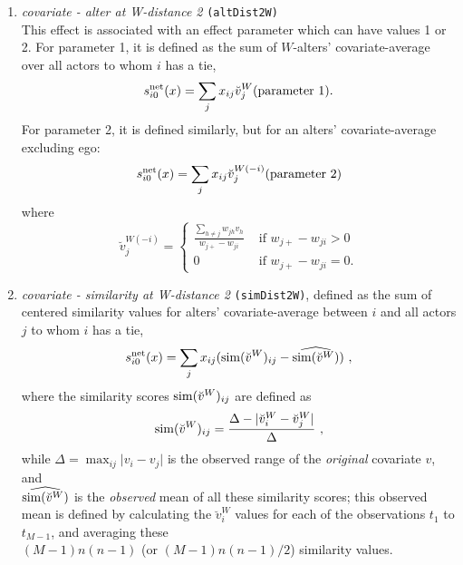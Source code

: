 \documentclass[a4paper,fleqn,11pt]{article}
\newcommand{\+}{\, + \,}
\newcommand{\vit}{\theenumi}
\newcounter{savenumi}
\begin{document}
\begin{enumerate}
\setcounter{enumi}{\value{savenumi}}

\item \emph{covariate - alter at W-distance 2} \texttt{(altDist2W)} \\ %
      This effect is associated with an effect parameter
      which can have values 1 or 2.
      For parameter 1, it is
      defined as the sum of $W$-alters' covariate-average over all actors
      to whom $i$ has a tie,
\[
 s^{\rm net}_{i\vit}(x) = \sum_j x_{ij} \breve v_j^W \hfill (\text{parameter 1}). \hfill
\]
      For parameter 2, it is defined similarly,
      but for an alters' covariate-average excluding
      ego:
\[
 s^{\rm net}_{i\vit}(x) = \sum_j x_{ij} \breve v_j^{W(-i)} \hfill (\text{parameter 2}) \hfill
\]
      where
\begin{equation}
  \breve v_j^{W(-i)} = \left\{\begin{array}{ll} \displaystyle
         \frac{\sum_{h \neq j} w_{jh}v_h}{w_{j+} - w_{ji}}  &  \text{ if } w_{j+} - w_{ji} > 0     \\
         0                                &  \text{ if } w_{j+}- w_{ji} = 0  .
  \end{array}   \right.
\end{equation}
\item \emph{covariate - similarity at W-distance 2} \texttt{(simDist2W)}, %
      defined as the sum of centered similarity
      values for alters' covariate-average between $i$ and all actors
      $j$ to whom $i$ has a tie,
\[
 s^{\rm net}_{i\vit}(x) = \sum_j x_{ij} ({\rm sim}(\breve v^W)_{ij}
  - \widehat{{\rm sim}({\breve v}^W)}) \ ,
\]
 where the similarity scores ${\rm sim}(\breve v^W)_{ij}$ are defined as
\[
{\rm sim}(\breve v^W)_{ij}=
 \frac{\Delta-\vert \breve v_i^W - \breve v_j^W \vert}{\Delta} \ ,
\]
 while
 $\Delta=\max_{ij}\vert v_i - v_j \vert$ is the observed range of the
 \emph{original} covariate $v$, and\\
 $\widehat{{\rm sim}({\breve v}^W)}$ is the
 \emph{observed} mean of all these similarity scores;
 this observed mean is defined by calculating the $\breve v_i^W$ values
 for each of the observations $t_1$ to $t_{M-1}$, and averaging
 these \\
 $(M-1)n(n-1)$ (or $(M-1)n(n-1)/2$) similarity values.
\setcounter{savenumi}{\value{enumi}}
\end{enumerate}
\end{document}
